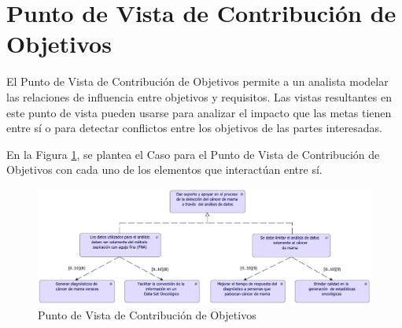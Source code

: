 \newpage
\section{Punto de Vista de Contribución de Objetivos}

El Punto de Vista de Contribución de Objetivos permite a un analista modelar las relaciones de influencia entre objetivos y requisitos. Las vistas resultantes en este punto de vista pueden usarse para analizar el impacto que las metas tienen entre sí o para detectar conflictos entre los objetivos de las partes interesadas\cite{BolanosCastro2019}. 

En la Figura \ref{PvContribucionObj}, se plantea el Caso para el Punto de Vista de Contribución de Objetivos con cada uno de los elementos que interactúan entre sí. 

\begin{figure}[h!]
	\centering
	\includegraphics[width=1\linewidth]{ARQUITECTURA/imgs/CapaMotivacion/3_PvContribucionObj}
	\caption{Punto de Vista de Contribución de Objetivos}
	\label{PvContribucionObj}
\end{figure}

